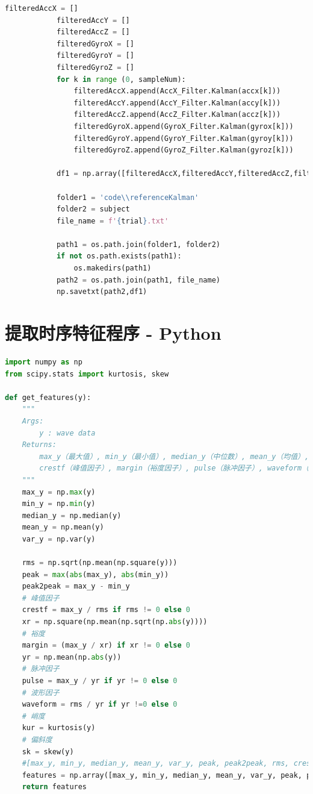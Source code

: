 \documentclass[withoutpreface]{cumcmthesis}
\begin{document}
\begin{appendices}
\begin{lstlisting}[language=python]
            filteredAccX = []
            filteredAccY = []
            filteredAccZ = []
            filteredGyroX = []
            filteredGyroY = []
            filteredGyroZ = []
            for k in range (0, sampleNum):
                filteredAccX.append(AccX_Filter.Kalman(accx[k]))
                filteredAccY.append(AccY_Filter.Kalman(accy[k]))
                filteredAccZ.append(AccZ_Filter.Kalman(accz[k]))
                filteredGyroX.append(GyroX_Filter.Kalman(gyrox[k]))
                filteredGyroY.append(GyroY_Filter.Kalman(gyroy[k]))
                filteredGyroZ.append(GyroZ_Filter.Kalman(gyroz[k]))
                
            df1 = np.array([filteredAccX,filteredAccY,filteredAccZ,filteredGyroX,filteredGyroY,filteredGyroZ])
            
            folder1 = 'code\\referenceKalman'
            folder2 = subject
            file_name = f'{trial}.txt'
      
            path1 = os.path.join(folder1, folder2)
            if not os.path.exists(path1):
                os.makedirs(path1)
            path2 = os.path.join(path1, file_name)
            np.savetxt(path2,df1)
\end{lstlisting}

\section{提取时序特征程序 - Python}

\begin{lstlisting}[language=python]
import numpy as np
from scipy.stats import kurtosis, skew

def get_features(y):
    """
    Args:
        y : wave data
    Returns:
        max_y（最大值）, min_y（最小值）, median_y（中位数）, mean_y（均值）, var_y（方差）, peak（峰值）, peak2peak（峰峰值）, rms（有效值），
        crestf（峰值因子）, margin（裕度因子）, pulse（脉冲因子）, waveform（波形因子）, kur（峭度因子）, sk（偏度因子）
    """
    max_y = np.max(y)
    min_y = np.min(y)
    median_y = np.median(y)
    mean_y = np.mean(y)
    var_y = np.var(y)
 
    rms = np.sqrt(np.mean(np.square(y)))
    peak = max(abs(max_y), abs(min_y))
    peak2peak = max_y - min_y
    # 峰值因子
    crestf = max_y / rms if rms != 0 else 0
    xr = np.square(np.mean(np.sqrt(np.abs(y))))
    # 裕度
    margin = (max_y / xr) if xr != 0 else 0 
    yr = np.mean(np.abs(y))
    # 脉冲因子
    pulse = max_y / yr if yr != 0 else 0 
    # 波形因子
    waveform = rms / yr if yr !=0 else 0  
    # 峭度
    kur = kurtosis(y) 
    # 偏斜度
    sk = skew(y)   
    #[max_y, min_y, median_y, mean_y, var_y, peak, peak2peak, rms, crestf, margin, pulse,waveform, kur, sk]
    features = np.array([max_y, min_y, median_y, mean_y, var_y, peak, peak2peak, rms]) 
    return features
    

\end{lstlisting}
\end{appendices}
\end{document}
